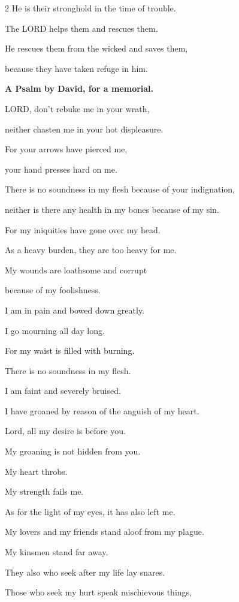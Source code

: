\begin{multicols}{2}
	He is their stronghold in the time of trouble.
	
	
	\myverse{}The LORD helps them and rescues them.
	
	He rescues them from the wicked and saves them,
	
	because they have taken refuge in him.
	
	
	\mychapter{}\textbf{A Psalm by David, for a memorial.}
	
	\quad \myverse*{}LORD, don’t rebuke me in your wrath,
	
	neither chasten me in your hot displeasure.
	
	
	\myverse{}For your arrows have pierced me,
	
	your hand presses hard on me.
	
	
	\myverse{}There is no soundness in my flesh because of your indignation,
	
	neither is there any health in my bones because of my sin.
	
	
	\myverse{}For my iniquities have gone over my head.
	
	As a heavy burden, they are too heavy for me.
	
	
	\myverse{}My wounds are loathsome and corrupt
	
	because of my foolishness.
	
	
	\myverse{}I am in pain and bowed down greatly.
	
	I go mourning all day long.
	
	
	\myverse{}For my waist is filled with burning.
	
	There is no soundness in my flesh.
	
	
	\myverse{}I am faint and severely bruised.
	
	I have groaned by reason of the anguish of my heart.
	
	
	\myverse{}Lord, all my desire is before you.
	
	My groaning is not hidden from you.
	
	
	\myverse{}My heart throbs.
	
	My strength fails me.
	
	As for the light of my eyes, it has also left me.
	
	
	\myverse{}My lovers and my friends stand aloof from my plague.
	
	My kinsmen stand far away.
	
	
	\myverse{}They also who seek after my life lay snares.
	
	Those who seek my hurt speak mischievous things,
	

\end{multicols}
